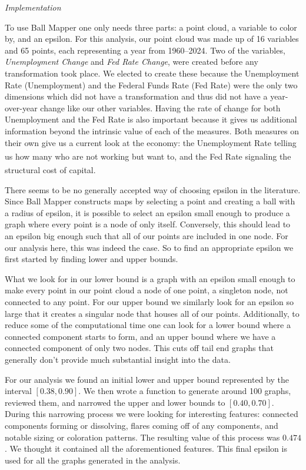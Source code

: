 \documentclass[
  10pt,
  letterpaper,
  DIV=11,
  numbers=noendperiod]{scrartcl}
\begin{document}
\emph{Implementation}

To use Ball Mapper one only needs three parts: a point cloud, a variable
to color by, and an epsilon. For this analysis, our point cloud was made
up of 16 variables and 65 points, each representing a year from
1960--2024. Two of the variables, \emph{Unemployment Change} and
\emph{Fed Rate Change}, were created before any transformation took
place. We elected to create these because the Unemployment Rate
(Unemployment) and the Federal Funds Rate (Fed Rate) were the only two
dimensions which did not have a transformation and thus did not have a
year-over-year change like our other variables. Having the rate of
change for both Unemployment and the Fed Rate is also important because
it gives us additional information beyond the intrinsic value of each of
the measures. Both measures on their own give us a current look at the
economy: the Unemployment Rate telling us how many who are not working
but want
to,\textsuperscript{} and
the Fed Rate signaling the structural cost of
capital.\textsuperscript{}

There seems to be no generally accepted way of choosing epsilon in the
literature. Since Ball Mapper constructs maps by selecting a point and
creating a ball with a radius of epsilon, it is possible to select an
epsilon small enough to produce a graph where every point is a node of
only itself. Conversely, this should lead to an epsilon big enough such
that all of our points are included in one node. For our analysis here,
this was indeed the case. So to find an appropriate epsilon we first
started by finding lower and upper bounds.

What we look for in our lower bound is a graph with an epsilon small
enough to make every point in our point cloud a node of one point, a
singleton node, not connected to any point. For our upper bound we
similarly look for an epsilon so large that it creates a singular node
that houses all of our points. Additionally, to reduce some of the
computational time one can look for a lower bound where a connected
component starts to form, and an upper bound where we have a connected
component of only two nodes. This cuts off tail end graphs that
generally don't provide much substantial insight into the data.

For our analysis we found an initial lower and upper bound represented
by the interval \([0.38, 0.90]\). We then wrote a function to generate
around 100 graphs, reviewed them, and narrowed the upper and lower
bounds to \([0.40, 0.70]\). During this narrowing process we were
looking for interesting features: connected components forming or
dissolving, flares coming off of any components, and notable sizing or
coloration patterns. The resulting value of this process was \(0.474\).
We thought it contained all the aforementioned features. This final
epsilon is used for all the graphs generated in the analysis.
\end{document}
